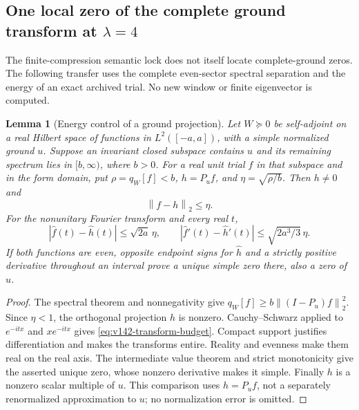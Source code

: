 \documentclass[11pt]{article}
\newtheorem{lemma}[theorem]{Lemma}
\theoremstyle{remark}
\newcommand{\norm}[1]{\left\lVert #1\right\rVert}
\begin{document}
\subsection*{One local zero of the complete ground transform at $\lambda=4$}

The finite-compression semantic lock does not itself locate complete-ground
zeros. The following transfer uses the complete even-sector spectral
separation and the energy of an exact archived trial. No new window or
finite eigenvector is computed.

\begin{lemma}[Energy control of a ground projection]
\label{lem:v142-energy-projection}
Let $W\succeq0$ be self-adjoint on a real Hilbert space of functions in
$L^2([-a,a])$, with a simple normalized ground $u$. Suppose an invariant
closed subspace contains $u$ and its remaining spectrum lies in
$[b,\infty)$, where $b>0$. For a real unit trial $f$ in that subspace and
in the form domain, put $\rho=q_W[f]<b$, $h=P_u f$, and
$\eta=\sqrt{\rho/b}$. Then $h\ne0$ and
\[
 \norm{f-h}_2\le\eta.
\]
For the nonunitary Fourier transform and every real $t$,
\begin{equation}\label{eq:v142-transform-budget}
 |\widehat f(t)-\widehat h(t)|\le\sqrt{2a}\,\eta,
 \qquad
 |\widehat f'(t)-\widehat h'(t)|\le\sqrt{2a^3/3}\,\eta.
\end{equation}
If both functions are even, opposite endpoint signs for $\widehat h$
and a strictly positive derivative throughout an interval prove a
unique simple zero there, also a zero of $\widehat u$.
\end{lemma}
\begin{proof}
The spectral theorem and nonnegativity give
$q_W[f]\ge b\norm{(I-P_u)f}_2^2$. Since $\eta<1$, the orthogonal
projection $h$ is nonzero. Cauchy--Schwarz applied to $e^{-itx}$ and
$xe^{-itx}$ gives \eqref{eq:v142-transform-budget}. Compact support
justifies differentiation and makes the transforms entire. Reality
and evenness make them real on the real axis. The intermediate value
theorem and strict monotonicity give the asserted unique zero, whose
nonzero derivative makes it simple. Finally $h$ is a nonzero scalar
multiple of $u$. This comparison uses $h=P_u f$, not a separately
renormalized approximation to $u$; no normalization error is omitted.
\end{proof}
\end{document}
